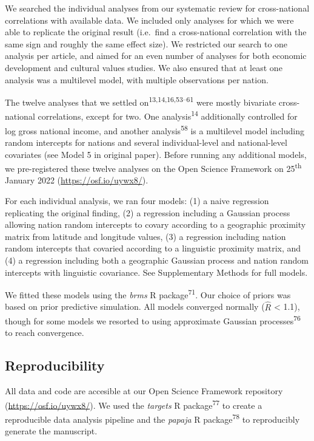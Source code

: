 \documentclass[
  man,floatsintext]{apa6}
\begin{document}
We searched the individual analyses from our systematic review for cross-national correlations with available data. We included only analyses for which we were able to replicate the original result (i.e.~find a cross-national correlation with the same sign and roughly the same effect size). We restricted our search to one analysis per article, and aimed for an even number of analyses for both economic development and cultural values studies. We also ensured that at least one analysis was a multilevel model, with multiple observations per nation.

The twelve analyses that we settled on\textsuperscript{13,14,16,53--61} were mostly bivariate cross-national correlations, except for two. One analysis\textsuperscript{14} additionally controlled for log gross national income, and another analysis\textsuperscript{58} is a multilevel model including random intercepts for nations and several individual-level and national-level covariates (see Model 5 in original paper). Before running any additional models, we pre-registered these twelve analyses on the Open Science Framework on 25\textsuperscript{th} January 2022 (\url{https://osf.io/uywx8/}).

For each individual analysis, we ran four models: (1) a naive regression replicating the original finding, (2) a regression including a Gaussian process allowing nation random intercepts to covary according to a geographic proximity matrix from latitude and longitude values, (3) a regression including nation random intercepts that covaried according to a linguistic proximity matrix, and (4) a regression including both a geographic Gaussian process and nation random intercepts with linguistic covariance. See Supplementary Methods for full models.

We fitted these models using the \emph{brms} R package\textsuperscript{71}. Our choice of priors was based on prior predictive simulation. All models converged normally (\(\hat{R}\) \textless{} 1.1), though for some models we resorted to using approximate Gaussian processes\textsuperscript{76} to reach convergence.

\hypertarget{reproducibility}{%
\subsection{Reproducibility}\label{reproducibility}}

All data and code are accesible at our Open Science Framework repository (\url{https://osf.io/uywx8/}). We used the \emph{targets} R package\textsuperscript{77} to create a reproducible data analysis pipeline and the \emph{papaja} R package\textsuperscript{78} to reproducibly generate the manuscript.
\end{document}
